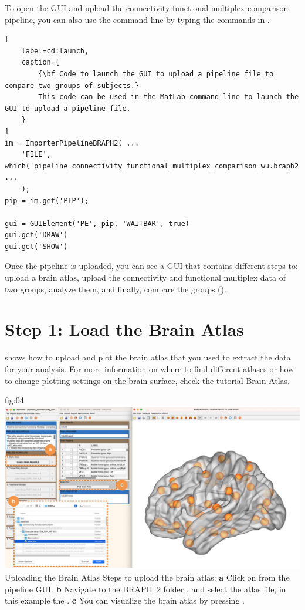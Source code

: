 \documentclass[justified]{tufte-handout}
\begin{document}
\begin{tcolorbox}[
	title=Pipeline launch from command line
]
To open the GUI and upload the connectivity-functional multiplex comparison pipeline, you can also use the command line by typing the commands in .

\begin{lstlisting}[
	label=cd:launch,
	caption={
		{\bf Code to launch the GUI to upload a pipeline file to compare two groups of subjects.}
		This code can be used in the MatLab command line to launch the GUI to upload a pipeline file.
	}
]
im = ImporterPipelineBRAPH2( ...
	'FILE', which('pipeline_connectivity_functional_multiplex_comparison_wu.braph2') ...
	);
pip = im.get('PIP');

gui = GUIElement('PE', pip, 'WAITBAR', true)
gui.get('DRAW')
gui.get('SHOW')
\end{lstlisting}
\end{tcolorbox}

Once the pipeline is uploaded, you can see a GUI that contains different steps to: upload a brain atlas, upload the connectivity and functional multiplex data of two groups, analyze them, and finally, compare the groups ().


\clearpage

\section{Step 1: Load the Brain Atlas}

 shows how to upload and plot the brain atlas that you used to extract the data for your analysis. For more information on where to find different atlases or how to change plotting settings on the brain surface, check the tutorial \href{https://github.com/braph-software/BRAPH-2/tree/develop/tutorials/data/tut_ba}{Brain Atlas}.

	{fig:04}
	{\includegraphics{fig04.jpg}}
	{Uploading the Brain Atlas}
	{
	Steps to upload the brain atlas:
	{\bf a} Click on  from the pipeline GUI.
	{\bf b} Navigate to the BRAPH~2 folder , and select the atlas file, in this example the .  
	{\bf c} You can visualize the brain atlas by pressing . 
	}
 
\end{document}
